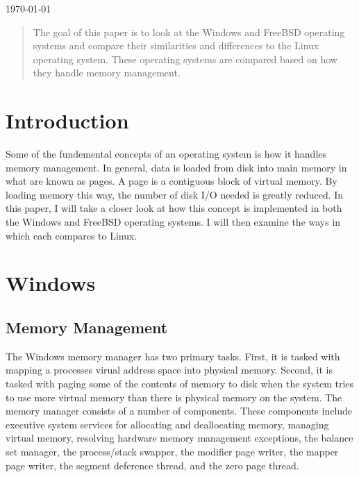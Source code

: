 \documentclass[journal,letterpaper,draftclsnofoot,onecolumn,10pt]{IEEEtran}
\begin{document}
\begin{titlepage}

{\large \today}\\[3cm] %

\begin{abstract}
The goal of this paper is to look at the Windows and FreeBSD operating systems and compare their similarities and differences to the Linux operating system. These operating systems are compared based on how they handle memory management.
\end{abstract}

\vfill %

\pagebreak

\end{titlepage}

\setlength{\parindent}{3ex}

\section{Introduction}
Some of the fundemental concepts of an operating system is how it handles memory management. In general, data is loaded from disk into main memory in what are known as pages. A page is a contiguous block of virtual memory. By loading memory this way, the number of disk I/O needed is greatly reduced. In this paper, I will take a closer look at how this concept is implemented in both the Windows and FreeBSD operating systems. I will then examine the ways in which each compares to Linux.

\section{Windows}

\subsection{Memory Management}
The Windows memory manager has two primary tasks. First, it is tasked with mapping a processes virual address space into physical memory. Second, it is tasked with paging some of the contents of memory to disk when the system tries to use more virtual memory than there is physical memory on the system. The memory manager consists of a number of components. These components include executive system services for allocating and deallocating memory, managing virtual memory, resolving hardware memory management exceptions, the balance set manager, the process/stack swapper, the modifier page writer, the mapper page writer, the segment deference thread, and the zero page thread.\cite{2ris12}
\end{document}
